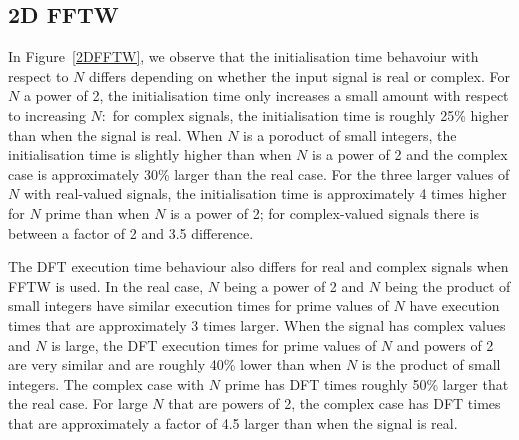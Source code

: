 \documentclass[12pt, a4paper]{article}
\begin{document}
\subsection{2D FFTW}
In Figure~\ref{2DFFTW}, we observe that the initialisation time behavoiur with respect to $N$ differs depending on whether the input signal is real or complex. For $N$ a power of 2, the initialisation time only increases a small amount with respect to increasing $N:$ for complex signals, the initialisation time is roughly 25\% higher than when the signal is real. When $N$ is a poroduct of small integers, the initialisation time is slightly higher than when $N$ is a power of 2 and the complex case is approximately 30\% larger than the real case. For the three larger values of $N$ with real-valued signals, the initialisation time is approximately 4 times higher for $N$ prime than when $N$ is a power of 2; for complex-valued signals there is between a factor of 2 and 3.5 difference.

The DFT execution time behaviour also differs for real and complex signals when FFTW is used. In the real case, $N$ being a power of 2 and $N$ being the product of small integers have similar execution times for prime values of $N$ have execution times that are approximately 3 times larger. When the signal has complex values and $N$ is large, the DFT execution times for prime values of $N$ and powers of 2 are very similar and are roughly 40\% lower than when $N$ is the product of small integers. The complex case with $N$ prime has DFT times roughly 50\% larger that the real case. For large $N$ that are powers of 2, the complex case has DFT times that are approximately a factor of 4.5 larger than when the signal is real.
\end{document}

